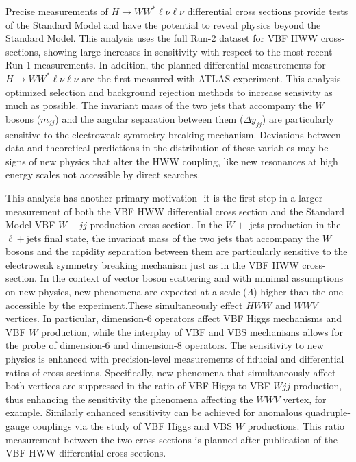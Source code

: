 Precise measurements of $H\rightarrow WW^*\ell\nu\ell\nu$ differential cross sections provide tests of the Standard Model and have the potential to reveal physics beyond the Standard Model. This analysis uses the full Run-2 dataset for VBF HWW cross-sections, showing large increases in sensitivity with respect to the most recent Run-1 measurements. In addition, the planned differential measurements for $H\rightarrow WW^*\ell\nu\ell\nu$ are the first measured with ATLAS experiment. This analysis optimized selection and background rejection methods to increase sensivity as much as possible. The invariant mass of the two jets that accompany the $W$ bosons ($m_{jj}$) and the angular separation between them ($\Delta y_{jj}$) are particularly sensitive to the electroweak symmetry breaking mechanism. Deviations between data and theoretical predictions in the distribution of these variables may be signs of new physics that alter the HWW coupling, like new resonances at high energy scales not accessible by direct searches. 

This analysis has another primary motivation- it is the first step in a larger measurement of both the VBF HWW differential cross section and the Standard Model VBF $W+jj$ production cross-section. In the $W+$ jets production in the $\ell+$jets final state, the invariant mass of the two jets that accompany the $W$ bosons and the rapidity separation between them are particularly sensitive to the electroweak symmetry breaking mechanism just as in the VBF HWW cross-section. In the context of vector boson scattering and with minimal assumptions on new physics, new phenomena are expected at a scale ($\Lambda$) higher than the one accessible by the experiment.These simultaneously effect $HWW$ and $WWV$ vertices. In particular, dimension-6 operators affect VBF Higgs mechanisms and VBF $W$ production, while the interplay of VBF and VBS mechanisms allows for the probe of dimension-6 and dimension-8 operators. The sensitivity to new physics is enhanced with precision-level measurements of fiducial and differential ratios of cross sections. Specifically, new phenomena that simultaneously affect both vertices are suppressed in the ratio of VBF Higgs to VBF $Wjj$ production, thus enhancing the sensitivity the phenomena affecting the $WWV$ vertex, for example. Similarly enhanced sensitivity can be achieved for anomalous quadruple-gauge couplings via the study of VBF Higgs and VBS $W$ productions. This ratio measurement between the two cross-sections is planned after publication of the VBF HWW differential cross-sections.

